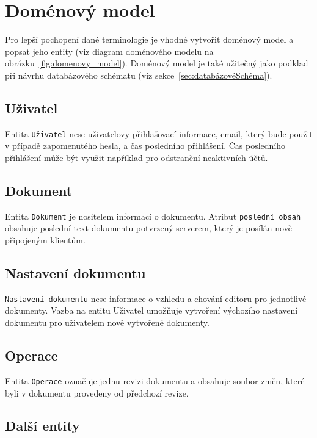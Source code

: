 \section{Doménový model}\label{sec:domenovyModel}

Pro lepší pochopení dané terminologie je vhodné vytvořit doménový model a popsat jeho entity (viz diagram doménového modelu na obrázku~\ref{fig:domenovy_model}).
Doménový model je také užitečný jako podklad při návrhu databázového schématu (viz sekce~\ref{sec:databázovéSchéma}).

\subsection{Uživatel}\label{subsec:uživatel}

Entita \texttt{Uživatel} nese uživatelovy přihlašovací informace, email, který bude použit v případě zapomenutého hesla, a čas posledního přihlášení.
Čas posledního přihlášení může být využit například pro odstranění neaktivních účtů.

\subsection{Dokument}\label{subsec:dokument}

Entita \texttt{Dokument} je nositelem informací o dokumentu.
Atribut \texttt{poslední obsah} obsahuje poslední text dokumentu potvrzený serverem, který je posílán nově připojeným klientům.

\subsection{Nastavení dokumentu}\label{subsec:nastaveníDokumentu}

\texttt{Nastavení dokumentu} nese informace o vzhledu a chování editoru pro jednotlivé dokumenty.
Vazba na entitu Uživatel umožňuje vytvoření výchozího nastavení dokumentu pro uživatelem nově vytvořené dokumenty.

\subsection{Operace}\label{subsec:operace}

Entita \texttt{Operace} označuje jednu revizi dokumentu a obsahuje soubor změn, které byli v dokumentu provedeny od předchozí revize.

\subsection{Další entity}\label{subsec:dalšíEntity}

